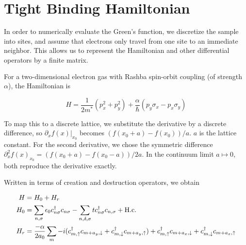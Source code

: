 \documentclass[11pt,twoside]{book}
\newcommand{\inp}[1]{\ensuremath{\left(#1\right)}}
\newcommand{\dell}{\partial}
\begin{document}
\section{Tight Binding Hamiltonian}
\label{sec:tight-binding}

In order to numerically evaluate the Green's function, we
discretize the sample into sites, and assume that electrons only travel from
one site to an immediate neighbor. This allows us to represent the
Hamiltonian and other differential operators by a finite matrix.


%
%

For a two-dimensional electron gas with Rashba spin-orbit coupling (of
strength $\alpha$), the Hamiltonian is

\begin{equation}
    H = \frac{1}{2 m^*} (p_x^2 + p_y^2) +
    \frac{\alpha}{\hbar} \inp{p_y\sigma_x - p_x\sigma_y}
\end{equation}

To map this to a discrete lattice, we substitute the derivative by a discrete
difference, so $\dell_x f(x)|_{x_0}$ becomes $(f(x_0+a) - f(x_0))/a$. $a$ is
the lattice constant. For the
second derivative, we chose the symmetric difference $\dell_x^2 f(x)_{x_0} =
(f(x_0+a) - f(x_0-a))/2a$. In the continuum limit $a \mapsto 0$, both reproduce
the derivative exactly.

Written in terms of creation and destruction operators, we obtain

\begin{align}
    H   &= H_0 + H_r\\
    H_0 &= \sum_{n,\sigma} \epsilon_0 c^{\dagger}_{n\sigma} c_{n\sigma}
           - \sum_{n,\delta,\sigma} t c^\dagger_{n\sigma} c_{n,\sigma} +
           \textnormal{H.c.}\\
    H_r &= \frac{-\alpha}{2 a_0} \sum_m
        -i( c^\dagger_{m,\uparrow} c_{m+a_y,\downarrow}
            + c^\dagger_{m,\downarrow} c_{m+a_y,\uparrow})
         + c^\dagger_{m,\uparrow} c_{m+a_x,\downarrow}
            + c^\dagger_{m,\downarrow} c_{m+a_x,\uparrow}
\end{align}
\end{document}
